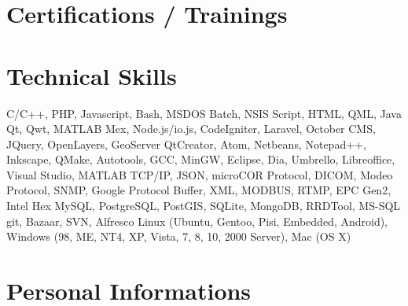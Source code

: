 \documentclass{moderncv}                          %
\begin{document}
\section{Certifications / Trainings}




\section{Technical Skills}

{C/C++, PHP, Javascript, Bash, MSDOS Batch, NSIS Script, HTML, QML, Java}
{Qt, Qwt, MATLAB Mex, Node.js/io.js, CodeIgniter, Laravel, October CMS, JQuery, OpenLayers, GeoServer}
{QtCreator, Atom, Netbeans, Notepad++, Inkscape, QMake, Autotools, GCC, MinGW, Eclipse, Dia, Umbrello, Libreoffice, Visual Studio, MATLAB}
{TCP/IP, JSON, microCOR Protocol, DICOM, Modeo Protocol, SNMP, Google Protocol Buffer, XML, MODBUS, RTMP, EPC Gen2, Intel Hex}
{MySQL, PostgreSQL, PostGIS, SQLite, MongoDB, RRDTool, MS-SQL}
{git, Bazaar, SVN, Alfresco}
{Linux (Ubuntu, Gentoo, Pisi, Embedded, Android), Windows (98, ME, NT4, XP, Vista, 7, 8, 10, 2000 Server), Mac (OS X)}



\section{Personal Informations}


\nocite{*}
%
\end{document}
